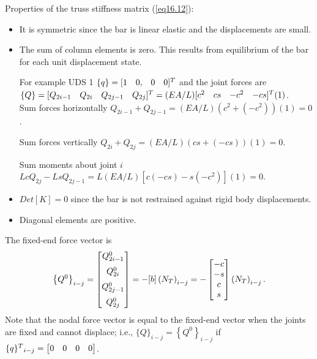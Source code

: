 \documentclass{AeroStructure-ERJohnson}
\begin{document}
Properties of the truss stiffness matrix (\ref{eq16.12}):
\begin{itemize}
\item It is symmetric since the bar is linear elastic and the displacements are small.

\item The sum of column elements is zero. This results from equilibrium of the bar for each unit displacement state.

For example UDS 1 $\{q\}=[\begin{array}{@{}llll@{}} 1& 0, & 0 & 0\end{array}]^{T}$ and the joint forces are\\[-3pt]

$\{Q\}=[\begin{array}{@{}llll@{}}Q_{2 i-1} & Q_{2 i} & Q_{2 j-1} & Q_{2 j}\end{array}]^{T}=(E A / L)[\begin{array}{@{}cccc@{}}c^{2} & cs & -c^{2} & -cs\end{array}]^{T}(1)$.\\[-3pt]

Sum forces horizontally $Q_{2 i-1}+Q_{2 j-1}=(E A / L)(c^{2}+(-c^{2}))(1)=0$.

Sum forces vertically $Q_{2 i}+Q_{2 j}=(E A / L)(c s+(-c s))(1)=0$.

Sum moments about joint $i$ $L c Q_{2 j}-L s Q_{2 j-1}=L(E A / L)[c(-c s)-s(-c^{2})](1)=0$.

\item ${Det}[K]=0$ since the bar is not restrained against rigid body displacements.

\item Diagonal elements are positive.
\end{itemize}

The fixed-end force vector is
\begin{align}\label{eq16.13}
\left\{Q^{0}\right\}_{i-j}=\left[\begin{array}{@{}c@{}}Q_{2 i-1}^{0} \\[6pt] Q_{2 i}^{0} \\[6pt]Q_{2 j-1}^{0} \\[6pt]Q_{2 j}^{0}\end{array}\right]=-[b]\left(N_{T}\right)_{i-j}=-\left[\begin{array}{@{}c@{}}-c \\-s \\c \\s\end{array}\right]\left(N_{T}\right)_{i-j}.
\end{align}
Note that the nodal force vector is equal to the fixed-end vector when the joints are fixed and cannot displace; i.e., $\{Q\}_{i-j}=\left\{Q^{0}\right\}_{i-j}$ if $\{q\}^{T}{ }_{i-j}=\left[\begin{array}{@{}llll@{}}0 & 0 & 0 & 0\end{array}\right]$.
\end{document}
